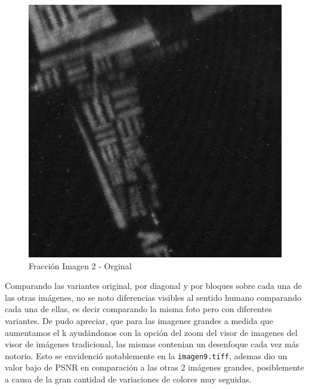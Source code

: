 \documentclass[a4paper]{article}
\newcounter{col}
\begin{document}
     \begin{figure}[H]
    \centering
    \includegraphics[scale=0.5]{imagenes/imagen2informeOriginal.png}
    \caption{Fracci\'on Imagen 2 - Orginal}
    \end{figure}
Comparando las variantes original, por diagonal y por bloques sobre cada una de las otras im\'agenes, no se noto diferencias visibles al sentido humano comparando cada una de ellas, es decir comparando la misma foto pero con diferentes variantes.
De pudo apreciar, que para las imagenes grandes a medida que aumentamos el k ayud\'andonos con la opci\'on del zoom del visor de imagenes del visor de im\'agenes tradicional, las mismas contenian un desenfoque cada vez m\'as notorio. Esto se envidenci\'o notablemente en la \texttt{imagen9.tiff}, ademas dio un valor bajo de PSNR en comparaci\'on a las otras 2 im\'agenes grandes, posiblemente a causa de la gran cantidad de variaciones de colores muy seguidas.\\
\end{document}
